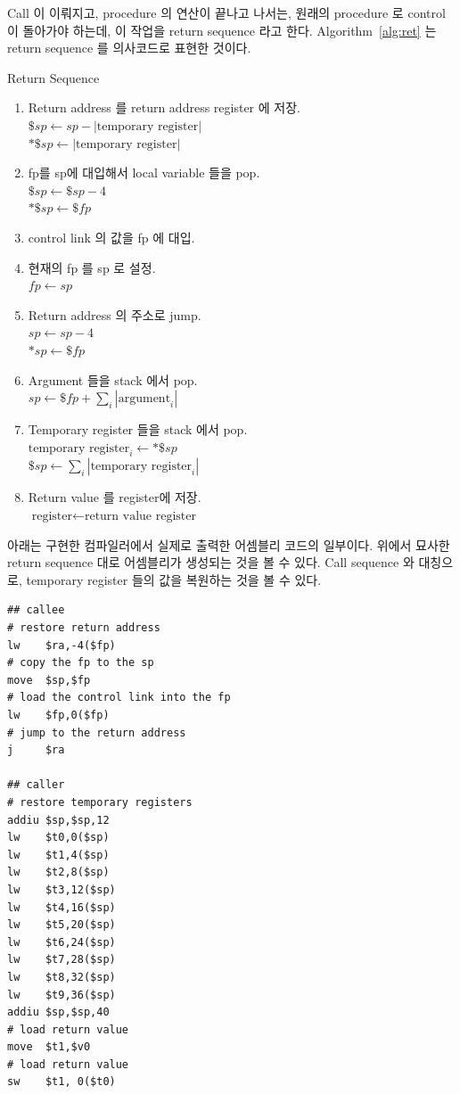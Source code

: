 \documentclass[a4paper,12p]{paper}
\begin{document}
Call 이 이뤄지고, procedure 의 연산이 끝나고 나서는, 원래의 procedure 로 control 이 돌아가야 하는데, 이 작업을 return sequence 라고 한다. Algorithm~\ref{alg:ret} 는 return sequence 를 의사코드로 표현한 것이다.

\begin{algorithm}[htpb]
  \caption{Return Sequence}\label{alg:ret}
  \begin{enumerate}
    \item Return address 를 return address register 에 저장. \\
      $\$sp    \leftarrow sp - |\text{temporary register}|$ \\
      $*\$sp   \leftarrow |\text{temporary register}|$
    \item fp를 sp에 대입해서 local variable 들을 pop.  \\
      $\$sp \leftarrow \$sp - 4$ \\
      $*\$sp \leftarrow \$fp $
    \item control link 의 값을 fp 에 대입.
    \item 현재의 fp 를 sp 로 설정. \\
      $fp \leftarrow sp$
    \item Return address 의 주소로 jump.\\
      $sp  \leftarrow sp - 4$ \\
      $*sp \leftarrow \$fp $
    \item Argument 들을 stack 에서 pop. \\
      $sp \leftarrow \$fp + \sum_i |\text{argument}_i| $
    \item Temporary register 들을 stack 에서 pop. \\
      $\text{temporary register}_i \leftarrow *\$sp$ \\
      $ \$sp \leftarrow \sum_i |\text{temporary register}_i| $
    \item Return value 를 register에 저장. \\
      $ \text{register} \leftarrow \text{return value register} $

  \end{enumerate}
\end{algorithm}


아래는 구현한 컴파일러에서 실제로 출력한 어셈블리 코드의 일부이다. 위에서 묘사한 return sequence 대로 어셈블리가 생성되는 것을 볼 수 있다. Call sequence 와 대칭으로, temporary register 들의 값을 복원하는 것을 볼 수 있다.

\begin{verbatim}
## callee
# restore return address
lw    $ra,-4($fp)
# copy the fp to the sp
move  $sp,$fp
# load the control link into the fp
lw    $fp,0($fp)
# jump to the return address
j     $ra

## caller
# restore temporary registers
addiu $sp,$sp,12
lw    $t0,0($sp)
lw    $t1,4($sp)
lw    $t2,8($sp)
lw    $t3,12($sp)
lw    $t4,16($sp)
lw    $t5,20($sp)
lw    $t6,24($sp)
lw    $t7,28($sp)
lw    $t8,32($sp)
lw    $t9,36($sp)
addiu $sp,$sp,40
# load return value
move  $t1,$v0
# load return value
sw    $t1, 0($t0)
\end{verbatim}
\end{document}
